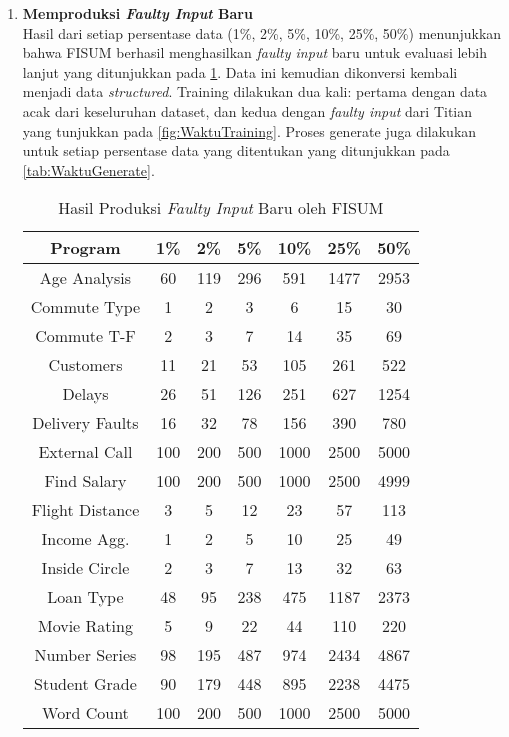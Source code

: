 \begin{enumerate}[topsep=0pt]
      \item \textbf{Memproduksi \emph{Faulty Input} Baru} \\
      Hasil dari setiap persentase data (1\%, 2\%, 5\%, 10\%, 25\%, 50\%) menunjukkan bahwa FISUM berhasil menghasilkan \emph{faulty input} baru untuk evaluasi lebih lanjut yang ditunjukkan pada \ref{tab:HasilProduksi}. Data ini kemudian dikonversi kembali menjadi data \emph{structured}.
      Training dilakukan dua kali: pertama dengan data acak dari keseluruhan dataset, dan kedua dengan \emph{faulty input} dari Titian yang tunjukkan pada \ref{fig:WaktuTraining}. Proses generate juga dilakukan untuk setiap persentase data yang ditentukan yang ditunjukkan pada \ref{tab:WaktuGenerate}.
      \begin{table}[H]
      \centering
      \caption{Hasil Produksi \emph{Faulty Input} Baru oleh FISUM}
      \label{tab:HasilProduksi}
      \begin{tabular}{|c|c|c|c|c|c|c|}
      \hline
      \textbf{Program} & \textbf{1\%} & \textbf{2\%} & \textbf{5\%} & \textbf{10\%} & \textbf{25\%} & \textbf{50\%} \\
      \hline
      Age Analysis & 60 & 119 & 296 & 591 & 1477 & 2953 \\
      \hline
      Commute Type & 1 & 2 & 3 & 6 & 15 & 30 \\
      \hline
      Commute T-F & 2 & 3 & 7 & 14 & 35 & 69 \\
      \hline
      Customers & 11 & 21 & 53 & 105 & 261 & 522 \\
      \hline
      Delays & 26 & 51 & 126 & 251 & 627 & 1254 \\
      \hline
      Delivery Faults & 16 & 32 & 78 & 156 & 390 & 780 \\
      \hline
      External Call & 100 & 200 & 500 & 1000 & 2500 & 5000 \\
      \hline
      Find Salary & 100 & 200 & 500 & 1000 & 2500 & 4999 \\
      \hline
      Flight Distance & 3 & 5 & 12 & 23 & 57 & 113 \\
      \hline
      Income Agg. & 1 & 2 & 5 & 10 & 25 & 49 \\
      \hline
      Inside Circle & 2 & 3 & 7 & 13 & 32 & 63 \\
      \hline
      Loan Type & 48 & 95 & 238 & 475 & 1187 & 2373 \\
      \hline
      Movie Rating & 5 & 9 & 22 & 44 & 110 & 220 \\
      \hline
      Number Series & 98 & 195 & 487 & 974 & 2434 & 4867 \\
      \hline
      Student Grade & 90 & 179 & 448 & 895 & 2238 & 4475 \\
      \hline
      Word Count & 100 & 200 & 500 & 1000 & 2500 & 5000 \\
      \hline
      \end{tabular}
      \end{table}


\end{enumerate}
